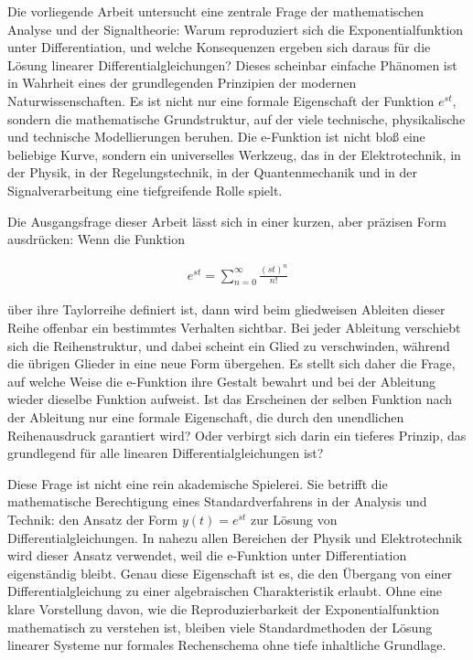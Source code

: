 \documentclass[a4paper, 12pt, twoside, openright]{report}
\theoremstyle{definition}
\theoremstyle{definition}
\begin{document}
Die vorliegende Arbeit untersucht eine zentrale Frage der mathematischen Analyse und der Signaltheorie: Warum reproduziert sich die Exponentialfunktion unter Differentiation, und welche Konsequenzen ergeben sich daraus für die Lösung linearer Differentialgleichungen? Dieses scheinbar einfache Phänomen ist in Wahrheit eines der grundlegenden Prinzipien der modernen Naturwissenschaften. Es ist nicht nur eine formale Eigenschaft der Funktion $e^{st}$, sondern die mathematische Grundstruktur, auf der viele technische, physikalische und technische Modellierungen beruhen. Die e-Funktion ist nicht bloß eine beliebige Kurve, sondern ein universelles Werkzeug, das in der Elektrotechnik, in der Physik, in der Regelungstechnik, in der Quantenmechanik und in der Signalverarbeitung eine tiefgreifende Rolle spielt.

Die Ausgangsfrage dieser Arbeit lässt sich in einer kurzen, aber präzisen Form ausdrücken: Wenn die Funktion

\begin{align}
    e^{st} = \sum_{n=0}^{\infty} \frac{(st)^n}{n!}
\end{align}

über ihre Taylorreihe definiert ist, dann wird beim gliedweisen Ableiten dieser Reihe offenbar ein bestimmtes Verhalten sichtbar. Bei jeder Ableitung verschiebt sich die Reihenstruktur, und dabei scheint ein Glied zu verschwinden, während die übrigen Glieder in eine neue Form übergehen. Es stellt sich daher die Frage, auf welche Weise die e-Funktion ihre Gestalt bewahrt und bei der Ableitung wieder dieselbe Funktion aufweist. Ist das Erscheinen der selben Funktion nach der Ableitung nur eine formale Eigenschaft, die durch den unendlichen Reihenausdruck garantiert wird? Oder verbirgt sich darin ein tieferes Prinzip, das grundlegend für alle linearen Differentialgleichungen ist?

Diese Frage ist nicht eine rein akademische Spielerei. Sie betrifft die mathematische Berechtigung eines Standardverfahrens in der Analysis und Technik: den Ansatz der Form $y(t) = e^{st}$ zur Lösung von Differentialgleichungen. In nahezu allen Bereichen der Physik und Elektrotechnik wird dieser Ansatz verwendet, weil die e-Funktion unter Differentiation eigenständig bleibt. Genau diese Eigenschaft ist es, die den Übergang von einer Differentialgleichung zu einer algebraischen Charakteristik erlaubt. Ohne eine klare Vorstellung davon, wie die Reproduzierbarkeit der Exponentialfunktion mathematisch zu verstehen ist, bleiben viele Standardmethoden der Lösung linearer Systeme nur formales Rechenschema ohne tiefe inhaltliche Grundlage.
\end{document}
